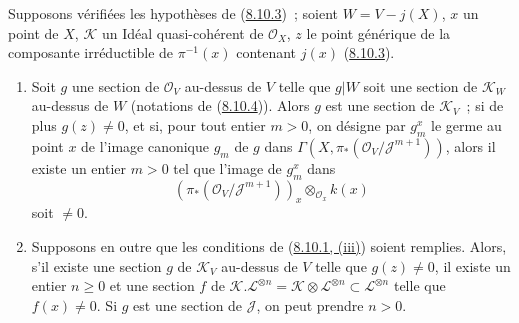 \begin{corollary}[8.10.5]
\label{II.8.10.5-fr}
Supposons vérifiées les hypothèses de (\hyperref[II.8.10.3-fr]{8.10.3})~;
soient $W=V-j(X)$, $x$ un point de $X$, $\mathcal{K}$ un Idéal
quasi-cohérent de $\mathcal{O}_X$, $z$ le point générique de la composante
irréductible de $\pi^{-1}(x)$ contenant $j(x)$
(\hyperref[II.8.10.3-fr]{8.10.3}).
\begin{enumerate}
  \item[\rm{(i)}] Soit $g$ une section de $\mathcal{O}_V$ au-dessus de $V$
  telle que $g|W$ soit une section de $\mathcal{K}_W$ au-dessus de $W$
  (notations de (\hyperref[II.8.10.4-fr]{8.10.4})). Alors $g$ est une section
  de $\mathcal{K}_V$~; si de plus $g(z)\neq0$, et si, pour tout entier $m>0$,
  on désigne par $g_m^x$ le germe au point $x$ de l'image canonique $g_m$ de
  $g$ dans
  $\Gamma(X,\pi_*(\mathcal{O}_V/\mathcal{J}^{m+1}))$, alors il existe un
  entier $m>0$ tel que l'image de $g_m^x$ dans
  \[
    (\pi_*(\mathcal{O}_V/\mathcal{J}^{m+1}))_x
    \otimes_{\mathcal{O}_x}k(x)
  \]
  soit $\neq0$.
  \item[\rm{(ii)}] Supposons en outre que les conditions de
  (\hyperref[II.8.10.1-fr]{8.10.1, (iii)}) soient remplies. Alors, s'il existe
  une section $g$ de $\mathcal{K}_V$ au-dessus de $V$ telle que $g(z)\neq0$,
  il existe un entier $n\geqslant0$ et une section $f$ de
  $\mathcal{K}.\mathcal{L}^{\otimes n}=
  \mathcal{K}\otimes\mathcal{L}^{\otimes n}\subset\mathcal{L}^{\otimes n}$
  telle que $f(x)\neq0$. Si $g$ est une section de $\mathcal{J}$, on peut
  prendre $n>0$.
\end{enumerate}
\end{corollary}

